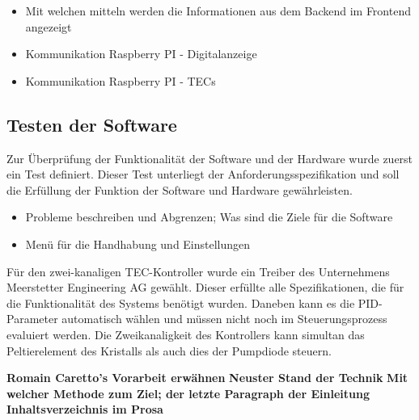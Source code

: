 \begin{itemize}
    \item Mit welchen mitteln werden die Informationen aus dem Backend im Frontend angezeigt
    \item Kommunikation Raspberry PI - Digitalanzeige
    \item Kommunikation Raspberry PI - TECs
\end{itemize}


\subsection{Testen der Software}
Zur Überprüfung der Funktionalität der Software und der Hardware wurde zuerst ein Test definiert. Dieser Test unterliegt der Anforderungsspezifikation und soll die Erfüllung der Funktion der Software und Hardware gewährleisten.

\begin{itemize}
    \item Probleme beschreiben und Abgrenzen; Was sind die Ziele für die Software
    \item Menü für die Handhabung und Einstellungen
\end{itemize}

Für den zwei-kanaligen TEC-Kontroller wurde ein Treiber des Unternehmens Meerstetter Engineering AG gewählt. Dieser erfüllte alle Spezifikationen, die für die Funktionalität des Systems benötigt wurden. Daneben kann es die PID-Parameter automatisch wählen und müssen nicht noch im Steuerungsprozess evaluiert werden. Die Zweikanaligkeit des Kontrollers kann simultan das Peltierelement des Kristalls als auch dies der Pumpdiode steuern.


\textbf{Romain Caretto's Vorarbeit erwähnen}
\textbf{Neuster Stand der Technik}
\textbf{Mit welcher Methode zum Ziel; der letzte Paragraph der Einleitung Inhaltsverzeichnis im Prosa}
\nocite{*}

